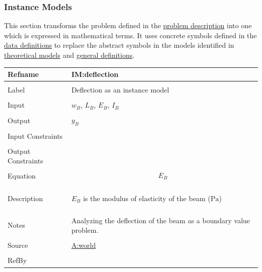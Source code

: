 \documentclass[12pt]{article}
\begin{document}
\subsubsection{Instance Models}
\label{Sec:IMs}
This section transforms the problem defined in the \hyperref[Sec:ProbDesc]{problem description} into one which is expressed in mathematical terms. It uses concrete symbols defined in the \hyperref[Sec:DDs]{data definitions} to replace the abstract symbols in the models identified in \hyperref[Sec:TMs]{theoretical models} and \hyperref[Sec:GDs]{general definitions}.

\vspace{\baselineskip}
\noindent
\begin{minipage}{\textwidth}
\begin{tabular}{>{\raggedright}p{}>{\raggedright\arraybackslash}p{}}
\toprule \textbf{Refname} & \textbf{IM:deflection}
\label{IM:deflection}
\\ \midrule \\
Label & Deflection as an instance model
        
\\ \midrule \\
Input & ${w_{B}}$, ${L_{B}}$, ${E_{B}}$, ${I_{B}}$
        
\\ \midrule \\
Output & ${y_{B}}$
         
\\ \midrule \\
Input Constraints & 
\\ \midrule \\
Output Constraints & 
\\ \midrule \\
Equation & \begin{displaymath}
           {E_{B}}
           \end{displaymath}
\\ \midrule \\
Description & \begin{symbDescription}
              \item{${E_{B}}$ is the modulus of elasticity of the beam (${\text{Pa}}$)}
              \end{symbDescription}
\\ \midrule \\
Notes & Analyzing the deflection of the beam as a boundary value problem.
        
\\ \midrule \\
Source & \hyperref[world]{A:world}
         
\\ \midrule \\
RefBy & 
\\ \bottomrule
\end{tabular}
\end{minipage}
\end{document}
